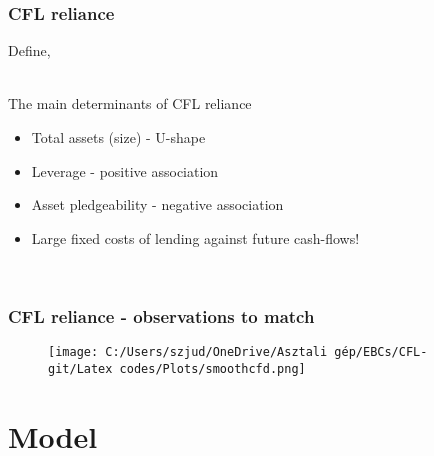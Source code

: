 \documentclass[notes]{beamer}
\begin{document}
\begin{frame}[label = nameit] \frametitle{CFL reliance}
Define, \\
\begin{center}
\end{center}
\vspace{3mm} \\
The main determinants of CFL reliance
 \begin{itemize}
     \setlength\itemsep{0em}
        \item Total assets (size) - U-shape
        \item Leverage - positive association
        \item Asset pledgeability - negative association
        \item Large fixed costs of lending against future cash-flows!
 \end{itemize} \vspace{3mm} \\

\begin{center}
\hyperlink{multi}{}
\hspace{2cm}
\hyperlink{fc}{}
\end{center}

 
\end{frame}


\begin{frame}[label=slide3] \frametitle{CFL reliance - observations to match}
\begin{figure}[H]  %
    \centering
    \texttt{[image: C:/Users/szjud/OneDrive/Asztali gép/EBCs/CFL-git/Latex codes/Plots/smoothcfd.png]}
\end{figure}
\begin{center}
\hyperlink{U_sector}{}
\hspace{2cm}
\hyperlink{U_country}{}
\end{center}
\end{frame}

\section{Model}
\end{document}
